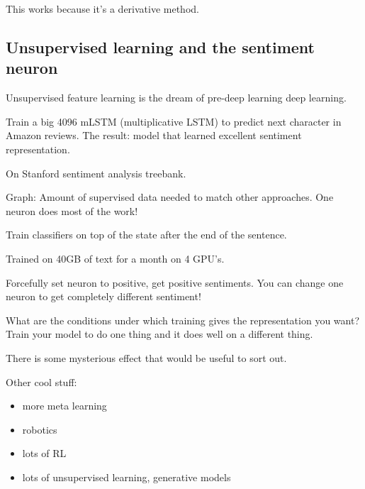 


This works because it's a derivative method.


\subsection{Unsupervised learning and the sentiment neuron}

Unsupervised feature learning is the dream of pre-deep learning deep learning.

Train a big 4096 mLSTM (multiplicative LSTM) to predict next character in Amazon reviews. The result: model that learned excellent sentiment representation. 

On Stanford sentiment analysis treebank.

Graph: Amount of supervised data needed to match other approaches.
One neuron does most of the work!

Train classifiers on top of the state after the end of the sentence.

Trained on 40GB of text for a month on 4 GPU's.

Forcefully set neuron to positive, get positive sentiments.
You can change one neuron to get completely different sentiment!

What are the conditions under which training gives the representation you want? Train your model to do one thing and it does well on a different thing.

There is some mysterious effect that would be useful to sort out.

Other cool stuff:
\begin{itemize}
\item
more meta learning
\item
robotics
\item
lots of RL
\item lots of unsupervised learning, generative models
\end{itemize}

